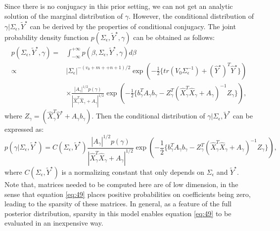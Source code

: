 \documentclass[twoside,11pt]{article}
\begin{document}
Since there is no conjugacy in this prior setting, we can not get an analytic solution of the marginal distribution of $\gamma$. However, the conditional distribution of $\gamma|\Sigma_\epsilon,\tilde{Y}^\star$ can be derived by the properties of conditional conjugacy. The joint probability density function $p(\Sigma_\epsilon,\tilde{Y}^\star,\gamma)$ can be obtained as follows:
\begin{equation} \label{eq:48}
\begin{split}
p(\Sigma_\epsilon,\tilde{Y}^\star,\gamma)= &\int_{-\infty}^{+\infty}p(\beta,\Sigma_\epsilon,\tilde{Y}^\star,\gamma)d\beta\\
\propto&|\Sigma_\epsilon|^{-(v_0+m++n+1)/2}\exp\left(-\frac{1}{2}\{tr(V_0\Sigma_\epsilon^{-1})+(\hat{Y}^\star)^T\hat{Y}^\star\}\right)\\
& \times\frac{|A_\gamma|^{1/2}p(\gamma)}{|\hat{X}_\gamma^T\hat{X}_\gamma+A_\gamma|^{1/2}}\exp\left(-\frac{1}{2}\{b_\gamma^TA_\gamma b_\gamma-Z_\gamma^T(\hat{X}_\gamma^T\hat{X}_\gamma+A_\gamma)^{-1} Z_\gamma\}\right),
\end{split}
\end{equation}
where $Z_\gamma=(\hat{X}_\gamma^T\hat{Y}^\star+A_\gamma b_\gamma)$.
Then the conditional distribution of $\gamma|\Sigma_\epsilon,\tilde{Y}^\star$ can be expressed as:
\begin{equation} \label{eq:49}
p(\gamma|\Sigma_\epsilon,\tilde{Y}^\star)=  C(\Sigma_\epsilon,\tilde{Y}^\star)\frac{|A_\gamma|^{1/2}p(\gamma)}{|\hat{X}_\gamma^T\hat{X}_\gamma+A_\gamma|^{1/2}}\exp\left(-\frac{1}{2}\{b_\gamma^TA_\gamma b_\gamma-Z_\gamma^T(\hat{X}_\gamma^T\hat{X}_\gamma+A_\gamma)^{-1} Z_\gamma\}\right),
\end{equation}
where $C(\Sigma_\epsilon,\tilde{Y}^\star)$ is a normalizing constant that only depends on $\Sigma_\epsilon$ and $\tilde{Y}^\star$. Note that,  matrices needed to be computed here are of low dimension, in the sense that equation \eqref{eq:49} places positive probabilities on coefficients being zero, leading to the sparsity of these matrices. In general, as a feature of the full posterior distribution, sparsity in this model enables equation \eqref{eq:49} to be evaluated in an inexpensive way.
\end{document}
